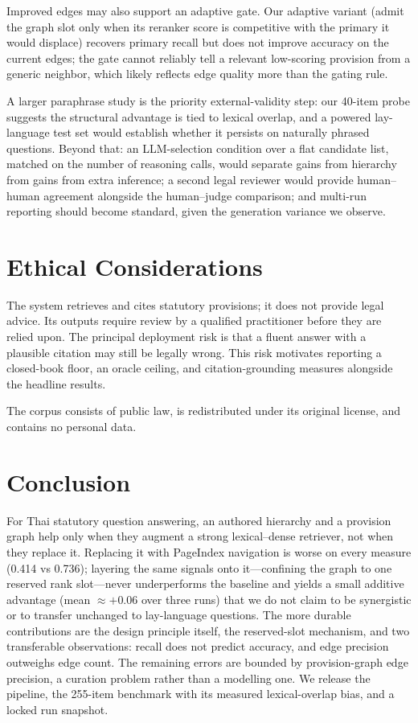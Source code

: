 \documentclass[conference]{IEEEtran}
\begin{document}
Improved edges may also support an adaptive gate. Our adaptive variant (admit the graph slot only
when its reranker score is competitive with the primary it would displace) recovers primary recall
but does not improve accuracy on the current edges; the gate cannot reliably tell a relevant
low-scoring provision from a generic neighbor, which likely reflects edge quality more than the gating
rule.

A larger paraphrase study is the priority external-validity step: our 40-item probe suggests the
structural advantage is tied to lexical overlap, and a powered lay-language test set would establish
whether it persists on naturally phrased questions. Beyond that: an LLM-selection condition over a
flat candidate list, matched on the number of reasoning calls, would separate gains from hierarchy
from gains from extra inference; a second legal reviewer would provide human--human agreement
alongside the human--judge comparison; and multi-run reporting should become standard, given the
generation variance we observe.

\section{Ethical Considerations}

The system retrieves and cites statutory provisions; it does not provide legal advice. Its outputs
require review by a qualified practitioner before they are relied upon. The principal deployment
risk is that a fluent answer with a plausible citation may still be legally wrong. This risk
motivates reporting a closed-book floor, an oracle ceiling, and citation-grounding measures alongside
the headline results.

The corpus consists of public law, is redistributed under its original license, and contains no
personal data.

\section{Conclusion}

For Thai statutory question answering, an authored hierarchy and a provision graph help only when
they augment a strong lexical--dense retriever, not when they replace it. Replacing it with PageIndex
navigation is worse on every measure (0.414 vs 0.736); layering the same signals onto it---confining
the graph to one reserved rank slot---never underperforms the baseline and yields a small additive
advantage (mean $\approx+0.06$ over three runs) that we do not claim to be synergistic or to transfer
unchanged to lay-language questions. The more durable contributions are the design principle itself,
the reserved-slot mechanism, and two transferable observations: recall does not predict accuracy, and
edge precision outweighs edge count. The remaining errors are bounded by provision-graph edge
precision, a curation problem rather than a modelling one. We release the pipeline, the 255-item
benchmark with its measured lexical-overlap bias, and a locked run snapshot.
\end{document}
